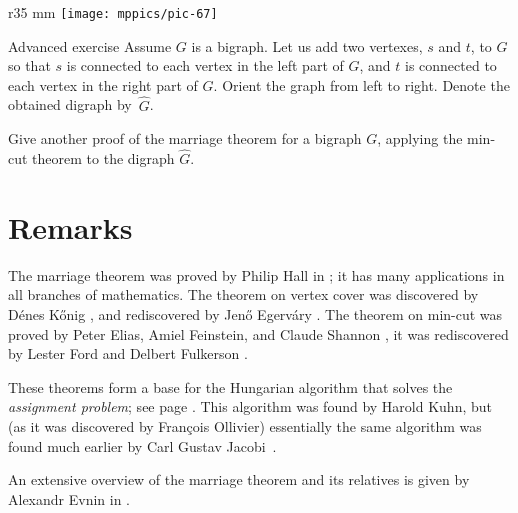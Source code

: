 {

\begin{wrapfigure}{r}{35 mm}
\vskip-0mm
\centering
\texttt{[image: mppics/pic-67]}
\end{wrapfigure}

\begin{thm}{Advanced exercise}
Assume $G$ is a bigraph.
Let us add two vertexes, $s$ and $t$, to $G$ so that $s$ is connected to each vertex in the left part of $G$, and $t$ is connected to each vertex in the right part of $G$.
Orient the graph from left to right.
Denote the obtained digraph by~$\hat G$.

Give another proof of the marriage theorem for a bigraph $G$, applying the min-cut theorem to the digraph $\hat G$. 
\end{thm}

}


\section*{Remarks}

The marriage theorem was proved by Philip Hall in \cite{hall};
it has many applications in all branches of mathematics.
The theorem on vertex cover was discovered by D\'enes K\H{o}nig \cite{konig}, and rediscovered by Jen\H{o} Egerv\'ary \cite{egervary}.
The theorem on min-cut was proved by Peter Elias, Amiel Feinstein, and Claude Shannon \cite{elias-feinstein-shannon}, 
it was rediscovered by Lester Ford and Delbert Fulkerson \cite{ford-fulkerson}.

These theorems form a base for the Hungarian algorithm that solves the \emph{assignment problem}; see page \pageref{assignment problem}.
This algorithm was found by Harold Kuhn, but (as it was discovered by François Ollivier) essentially the same algorithm was found much earlier by Carl Gustav Jacobi~\cite{ollivier}.

An extensive overview of the marriage theorem and its relatives is given by Alexandr Evnin in \cite{evnin}.
